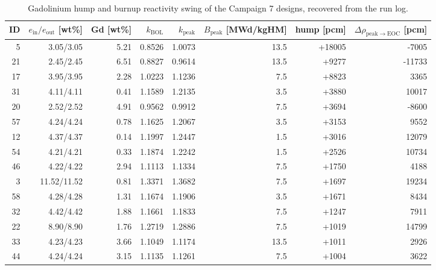 \begin{table}[htbp]
  \centering
  \caption[Reactivity hump of the Campaign 7 designs]{Gadolinium hump and burnup reactivity swing of the Campaign 7 designs, recovered from the run log.}
  \label{tab:c7-hump}
  \begin{tabular}{@{}r r r r r r r r@{}}
    \toprule
    ID & $e_\mathrm{in}/e_\mathrm{out}$ [wt\%] & Gd [wt\%] & $k_\mathrm{BOL}$ & $k_\mathrm{peak}$ & $B_\mathrm{peak}$ [MWd/kgHM] & hump [pcm] & $\Delta\rho_\mathrm{peak\to EOC}$ [pcm] \\
    \midrule
    5 & 3.05/3.05 & 5.21 & 0.8526 & 1.0073 & 13.5 & +18005 & -7005 \\
    21 & 2.45/2.45 & 6.51 & 0.8827 & 0.9614 & 13.5 & +9277 & -11733 \\
    17 & 3.95/3.95 & 2.28 & 1.0223 & 1.1236 & 7.5 & +8823 & 3365 \\
    31 & 4.11/4.11 & 0.41 & 1.1589 & 1.2135 & 3.5 & +3880 & 10017 \\
    20 & 2.52/2.52 & 4.91 & 0.9562 & 0.9912 & 7.5 & +3694 & -8600 \\
    57 & 4.24/4.24 & 0.78 & 1.1625 & 1.2067 & 3.5 & +3153 & 9552 \\
    12 & 4.37/4.37 & 0.14 & 1.1997 & 1.2447 & 1.5 & +3016 & 12079 \\
    54 & 4.21/4.21 & 0.33 & 1.1874 & 1.2242 & 1.5 & +2526 & 10734 \\
    46 & 4.22/4.22 & 2.94 & 1.1113 & 1.1334 & 7.5 & +1750 & 4188 \\
    3 & 11.52/11.52 & 0.81 & 1.3371 & 1.3682 & 7.5 & +1697 & 19234 \\
    58 & 4.28/4.28 & 1.31 & 1.1674 & 1.1906 & 3.5 & +1671 & 8434 \\
    32 & 4.42/4.42 & 1.88 & 1.1661 & 1.1833 & 7.5 & +1247 & 7911 \\
    22 & 8.90/8.90 & 1.76 & 1.2719 & 1.2886 & 7.5 & +1019 & 14799 \\
    33 & 4.23/4.23 & 3.66 & 1.1049 & 1.1174 & 13.5 & +1011 & 2926 \\
    44 & 4.24/4.24 & 3.15 & 1.1135 & 1.1261 & 7.5 & +1004 & 3622 \\
    \bottomrule
  \end{tabular}
\end{table}
